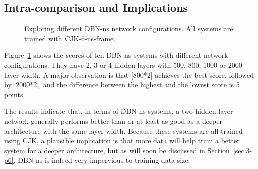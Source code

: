 \subsection{Intra-comparison and Implications}
 \label{sec:3-p1}

\begin{figure}[htb]
\centering
{}
\caption{Exploring different DBN-ns network configurations. All systems are trained with CJK-6-ns-frame.}
\label{fig:3-dbn-ns-configs}
\end{figure}

Figure~\ref{fig:3-dbn-ns-configs} shows the scores of ten DBN-ns systems with different network configurations. They have 2, 3 or 4 hidden layers with 500, 800, 1000 or 2000 layer width. A major observation is that [800*2] achieves the best score, followed by [2000*2], and the difference between the highest and the lowest score is 5 points.

The results indicate that, in terms of DBN-ns systems, a two-hidden-layer network generally performs better than or at least as good as a deeper architecture with the same layer width. Because these systems are all trained using CJK, a plausible implication is that more data will help train a better system for a deeper architecture, but as will soon be discussed in Section~\ref{sec:3-p6}, DBN-ns is indeed very impervious to training data size.%

